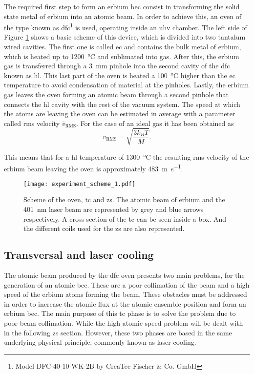 The required first step to form an erbium \ac{bec} consist in transforming the solid state metal of erbium into an atomic beam. In order to achieve this, an oven of the type known as \Acf{dfc}\footnote{Model DFC-40-10-WK-2B by CreaTec Fischer \& Co. GmbH} is used, operating inside an \ac{uhv} chamber. The left side of Figure \ref{fig:experiment_scheme_1} shows a basic scheme of this device, which is divided into two tantalum wired cavities. The first one is called \Acf{ec} and contains the bulk metal of erbium, which is heated up to \SI{1200}{\degreeCelsius} and sublimated into gas. After this, the erbium gas is transferred through a \SI{3}{\milli\meter} pinhole into the second cavity of the \ac{dfc} known as \Acf{hl}. This last part of the oven is heated a \SI{100}{\degreeCelsius} higher than the \ac{ec} temperature to avoid condensation of material at the pinholes. Lastly, the erbium gas leaves the oven forming an atomic beam through a second pinhole that connects the \ac{hl} cavity with the rest of the vacuum system. The speed at which the atoms are leaving the oven can be estimated in average with a parameter called \ac{rms} velocity $\bar{v}_\text{RMS}$. For the case of an ideal gas it has been obtained as \cite{Hansch1975}
\begin{equation}\label{eq:rms_velocity}
	\bar{v}_\text{RMS} = \sqrt{\frac{3 k_B T}{M}}.
\end{equation}

This means that for a \ac{hl} temperature of \SI{1300}{\degreeCelsius} the resulting \ac{rms} velocity of the erbium beam leaving the oven is approximately \SI{483}{\meter\per\second}.

\begin{figure}[!htbp]\centering
	\texttt{[image: experiment\_scheme\_1.pdf]}
	\caption[Oven, \acl{tc} and \acl{zs} schemes]{Scheme of the oven, \acl{tc} and \acl{zs}. The atomic beam of erbium and the \SI{401}{\nano\meter} laser beam are represented by grey and blue arrows respectively. A cross section of the \acl{tc} can be seen inside a box. And the different coils used for the \acl{zs} are also represented.}\label{fig:experiment_scheme_1}
\end{figure}

\subsection{Transversal and laser cooling}

The atomic beam produced by the \ac{dfc} oven presents two main problems, for the generation of an atomic \ac{bec}. These are a poor collimation of the beam and a high speed of the erbium atoms forming the beam. These obstacles must be addressed in order to increase the atomic flux at the atomic ensemble position and form an erbium \ac{bec}. The main purpose of this \acf{tc} phase is to solve the problem due to poor beam collimation. While the high atomic speed problem will be dealt with in the following \Acl{zs} section. However, these two phases are based in the same underlying physical principle, commonly known as laser cooling. 

